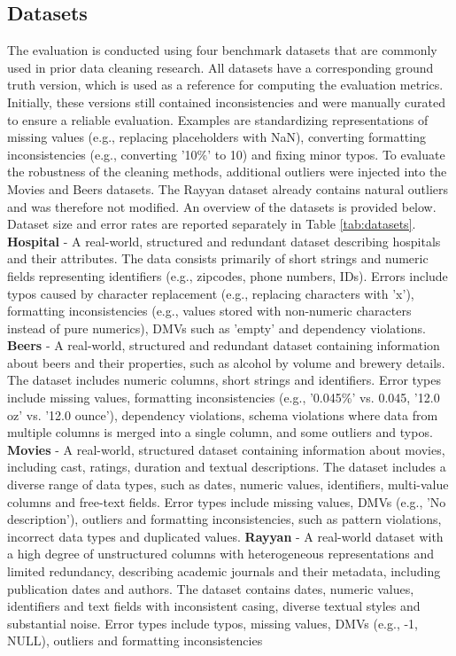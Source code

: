 \subsection{Datasets}
The evaluation is conducted using four benchmark datasets that are commonly used in prior data cleaning research. 
All datasets have a corresponding ground truth version, which is used as a reference for computing the evaluation metrics. 
Initially, these versions still contained inconsistencies and were manually curated to ensure a reliable evaluation. 
Examples are standardizing representations of missing values (e.g., replacing placeholders with NaN), converting formatting inconsistencies (e.g., converting '10\%' to 10) and fixing minor typos.
To evaluate the robustness of the cleaning methods, additional outliers were injected into the Movies and Beers datasets. 
The Rayyan dataset already contains natural outliers and was therefore not modified.
An overview of the datasets is provided below. 
Dataset size and error rates are reported separately in Table \ref{tab:datasets}.
\newline\newline
\textbf{Hospital} \cite{HOLOCLEAN} - A real-world, structured and redundant dataset describing hospitals and their attributes. 
The data consists primarily of short strings and numeric fields representing identifiers (e.g., zipcodes, phone numbers, IDs). 
Errors include typos caused by character replacement (e.g., replacing characters with 'x'), formatting inconsistencies (e.g., values stored with non-numeric characters instead of pure numerics), DMVs such as 'empty' and dependency violations.
\newline
\textbf{Beers} \cite{RAHA} - A real-world, structured and redundant dataset containing information about beers and their properties, such as alcohol by volume and brewery details. 
The dataset includes numeric columns, short strings and identifiers. 
Error types include missing values, formatting inconsistencies (e.g., '0.045\%' vs. 0.045, '12.0 oz' vs. '12.0 ounce'), dependency violations, schema violations where data from multiple columns is merged into a single column, and some outliers and typos.
\newline
\textbf{Movies} \cite{MDR} - A real-world, structured dataset containing information about movies, including cast, ratings, duration and textual descriptions. 
The dataset includes a diverse range of data types, such as dates, numeric values, identifiers, multi-value columns and free-text fields. 
Error types include missing values, DMVs (e.g., 'No description'), outliers and formatting inconsistencies, such as pattern violations, incorrect data types and duplicated values.
\newline
\textbf{Rayyan} \cite{RAYYAN} - A real-world dataset with a high degree of unstructured columns with heterogeneous representations and limited redundancy, describing academic journals and their metadata, including publication dates and authors. 
The dataset contains dates, numeric values, identifiers and text fields with inconsistent casing, diverse textual styles and substantial noise. 
Error types include typos, missing values, DMVs (e.g., -1, {NULL}), outliers and formatting inconsistencies

